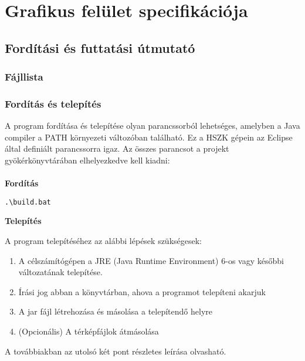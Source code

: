 %
\chapter{Grafikus felület specifikációja}

\thispagestyle{fancy}

\section{Fordítási és futtatási útmutató}

\subsection{Fájllista}


\subsection{Fordítás és telepítés}
A program fordítása és telepítése olyan parancssorból lehetséges, amelyben a Java compiler a PATH környezeti változóban található. Ez a HSZK gépein az Eclipse által definiált parancssorra igaz. Az összes parancsot a projekt gyökérkönyvtárában elhelyezkedve kell kiadni:
\\\\
\noindent \textbf{Fordítás}
\lstset{escapeinside=`', xleftmargin=10pt, frame=single, basicstyle=\ttfamily\footnotesize, language=sh}
\begin{lstlisting}
.\build.bat
\end{lstlisting}

\noindent \textbf{Telepítés}

\noindent A program telepítéséhez az alábbi lépések szükségesek:
\noindent \begin{enumerate}
    \item A célszámítógépen a JRE (Java Runtime Environment) 6-os vagy későbbi változatának telepítése.
    \item Írási jog abban a könyvtárban, ahova a programot telepíteni akarjuk
    \item A jar fájl létrehozása és másolása a telepítendő helyre
    \item (Opcionális) A térképfájlok átmásolása
\end{enumerate}

\noindent A továbbiakban az utolsó két pont részletes leírása olvasható.

